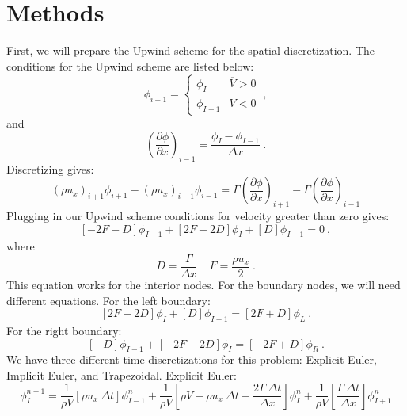 \documentclass[12pt]{article}
\begin{document}
\section{Methods}
First, we will prepare the Upwind scheme for the spatial discretization. The conditions for the Upwind scheme are listed below:
\begin{equation*}
    \phi_{i+1} = \begin{cases}
                    \phi_{I} & \overline{V} > 0\\
                    \phi_{I+1} & \overline{V} < 0
                 \end{cases}\:,
\end{equation*}
and
\begin{equation}
    \left(\frac{\partial \phi}{\partial x}\right)_{i-1} = \frac{\phi_{I} - \phi_{I-1}}{\Delta x}\:.
\end{equation}
Discretizing gives:
\begin{equation*}
    \left( \rho u_x \right)_{i+1} \phi_{i+1} - \left( \rho u_x \right)_{i-1} \phi_{i-1} = \Gamma \left( \frac{\partial \phi}{\partial x} \right)_{i+1} - \Gamma \left( \frac{\partial \phi}{\partial x} \right)_{i-1}
\end{equation*}
Plugging in our Upwind scheme conditions for velocity greater than zero gives:
\begin{equation*}
    \left[-2F - D  \right] \phi_{I-1} + \left[ 2F + 2D \right] \phi_{I} + \left[ D \right] \phi_{I+1} = 0\:,
\end{equation*}
where
\begin{equation*}
    D = \frac{\Gamma}{\Delta x} ~~~~~ F = \frac{\rho u_x}{2}\:.
\end{equation*}
This equation works for the interior nodes. For the boundary nodes, we will need different equations. For the left boundary:
\begin{equation*}
    \left[ 2F + 2D \right] \phi_{I} + \left[ D \right] \phi_{I+1} = \left[ 2F + D \right] \phi_{L}\:.
\end{equation*}
For the right boundary:
\begin{equation*}
    \left[ -D \right] \phi_{I-1} + \left[ -2F - 2D \right] \phi_{I} = \left[ -2F + D \right] \phi_{R}\:.
\end{equation*}
We have three different time discretizations for this problem: Explicit Euler, Implicit Euler, and Trapezoidal.
Explicit Euler:
\begin{equation*}
    \phi_{I}^{n+1} = \frac{1}{\rho V}\left[ \rho u_x\: \Delta t \right] \phi_{I-1}^{n} + \frac{1}{\rho V}\left[ \rho V - \rho u_x\: \Delta t - \frac{2\Gamma\: \Delta t}{\Delta x} \right] \phi_{I}^{n} + \frac{1}{\rho V}\left[ \frac{\Gamma\:\Delta t}{\Delta x} \right]\phi_{I+1}^{n}
\end{equation*}
\end{document}
